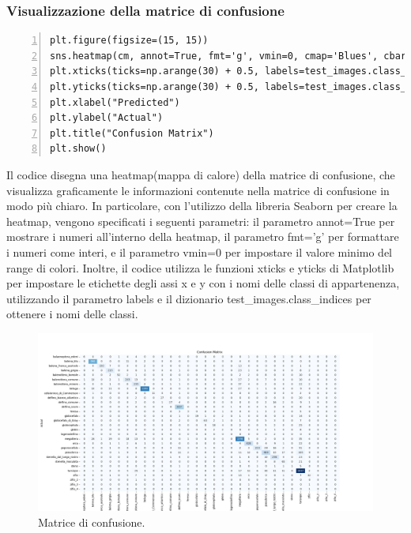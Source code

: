 \documentclass[a4paper,final,12pt]{report}
\begin{document}
\subsubsection{Visualizzazione della matrice di confusione}
\begin{lstlisting}[caption={Codice per la visualizzazione della matrice di confusione.}, label={lst:matrice_vista}, breaklines, escapechar=`\%, frame=lines, basicstyle=\small\ttfamily, keepspaces=true, numbers=left]
plt.figure(figsize=(15, 15))
sns.heatmap(cm, annot=True, fmt='g', vmin=0, cmap='Blues', cbar=False)
plt.xticks(ticks=np.arange(30) + 0.5, labels=test_images.class_indices, rotation=90)
plt.yticks(ticks=np.arange(30) + 0.5, labels=test_images.class_indices, rotation=0)
plt.xlabel("Predicted")
plt.ylabel("Actual")
plt.title("Confusion Matrix")
plt.show()
\end{lstlisting}
Il codice disegna una heatmap(mappa di calore) della matrice di confusione, che visualizza graficamente le informazioni contenute nella matrice di confusione in modo più chiaro. In particolare, con l'utilizzo della libreria Seaborn per creare la heatmap, vengono specificati i seguenti parametri: il parametro annot=True per mostrare i numeri all'interno della heatmap, il parametro fmt='g' per formattare i numeri come interi, e il parametro vmin=0 per impostare il valore minimo del range di colori.
Inoltre, il codice utilizza le funzioni xticks e yticks di Matplotlib per impostare le etichette degli assi x e y con i nomi delle classi di appartenenza, utilizzando il parametro labels e il dizionario test\_images.class\_indices per ottenere i nomi delle classi.
\begin{figure}[hbtp]
\centering
\includegraphics[scale=0.29]{img_concettuale/matConf.png}
\caption{Matrice di confusione.}
\end{figure}
\end{document}
